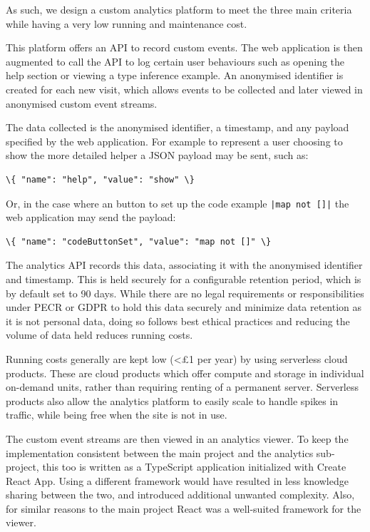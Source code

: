 \documentclass[a4paper,fleqn,oneside,12pt]{report}
\begin{document}
As such, we design a custom analytics platform to meet the three main criteria while having a very low running and maintenance cost.

This platform offers an API to record custom events. The web application is then augmented to call the API to log certain user behaviours such as opening the help section or viewing a type inference example. An anonymised identifier is created for each new visit, which allows events to be collected and later viewed in anonymised custom event streams.

The data collected is the anonymised identifier, a timestamp, and any payload specified by the web application. For example to represent a user choosing to show the more detailed helper a JSON payload may be sent, such as:

\begin{verbatim}
\{ "name": "help", "value": "show" \}
\end{verbatim}

Or, in the case where an button to set up the code example \texttt{|map not []|} the web application may send the payload: 

\begin{verbatim}
\{ "name": "codeButtonSet", "value": "map not []" \}
\end{verbatim}

The analytics API records this data, associating it with the anonymised identifier and timestamp. This is held securely for a configurable retention period, which is by default set to 90 days. While there are no legal requirements or responsibilities under PECR or GDPR to hold this data securely and minimize data retention as it is not personal data, doing so follows best ethical practices and reducing the volume of data held reduces running costs.

Running costs generally are kept low (<£1 per year) by using serverless cloud products. These are cloud products which offer compute and storage in individual on-demand units, rather than requiring renting of a permanent server. Serverless products also allow the analytics platform to easily scale to handle spikes in traffic, while being free when the site is not in use.

The custom event streams are then viewed in an analytics viewer. To keep the implementation consistent between the main project and the analytics sub-project, this too is written as a TypeScript application initialized with Create React App. Using a different framework would have resulted in less knowledge sharing between the two, and introduced additional unwanted complexity. Also, for similar reasons to the main project React was a well-suited framework for the viewer.
\end{document}

